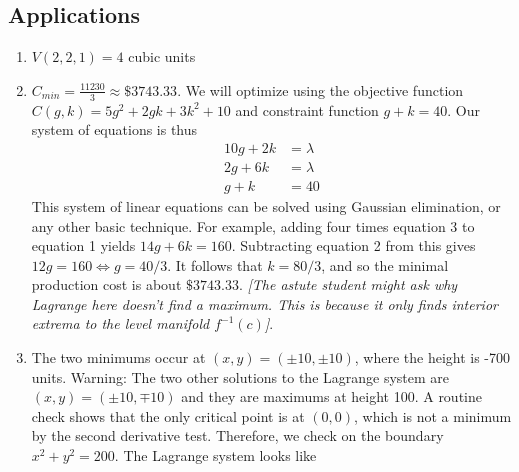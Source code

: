 \subsection*{Applications}
\begin{enumerate}[resume]
    \item {}  %
    {%
    $V(2,2,1)=4$ cubic units
    }
    {%
    } 
    \item {}
    {%
    $ C_{min}=\frac{11230}{3} \approx \$3743.33$.
    }
    {We will optimize using the objective function $C(g,k) = 5g^2+2gk+3k^2+10$ and constraint function $g+k=40$. Our system of equations is thus
\begin{align*}
    10g+2k &= \lambda  \\
    2g+6k &= \lambda \\
    g+k &= 40
\end{align*}
This system of linear equations can be solved using Gaussian elimination, or any other basic technique. For example, adding four times equation 3 to equation 1 yields $14g+6k=160$. Subtracting equation 2 from this gives $12g = 160 \iff g = 40/3$. It follows that $k = 80/3$, and so the minimal production cost is about $\$3743.33$. \textit{[The astute student might ask why Lagrange here doesn't find a maximum. This is because it only finds interior extrema to the level manifold $f^{-1}(c)$]}. 
    } 
    \item {}
    {%
    The two minimums occur at $(x,y)= (\pm 10,\pm 10)$, where the height is -700 units. Warning: The two other solutions to the Lagrange system are $(x,y)=(\pm 10,\mp 10)$ and they are maximums at height 100.
    }
    {A routine check shows that the only critical point is at $(0,0)$, which is not a minimum by the second derivative test. Therefore, we check on the boundary $x^2+y^2 = 200$. The Lagrange system looks like 
}
\end{enumerate}
